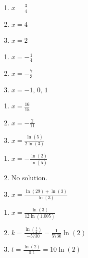 \begin{multicols}{3}
\begin{enumerate}

\item $x = \frac{3}{4}$
\item $x = 4$
\item $x=2$

\setcounter{HW}{\value{enumi}}
\end{enumerate}
\end{multicols}

\begin{multicols}{3}
\begin{enumerate}
\setcounter{enumi}{\value{HW}}

\item $x = -\frac{1}{4}$
\item $x = -\frac{7}{3}$
\item $x = -1, \, 0, \, 1$

\setcounter{HW}{\value{enumi}}
\end{enumerate}
\end{multicols}

\begin{multicols}{3}
\begin{enumerate}
\setcounter{enumi}{\value{HW}}

\item $x = \frac{16}{15}$
\item $x=-\frac{2}{11}$
\item $x = \frac{\ln(5)}{2\ln(3)}$

\setcounter{HW}{\value{enumi}}
\end{enumerate}
\end{multicols}

\begin{multicols}{3}
\begin{enumerate}
\setcounter{enumi}{\value{HW}}

\item $x = -\frac{\ln(2)}{\ln(5)}$
\item No solution.
\item $x = \frac{\ln(29) + \ln(3)}{\ln(3)}$

\setcounter{HW}{\value{enumi}}
\end{enumerate}
\end{multicols}

\begin{multicols}{3}
\begin{enumerate}
\setcounter{enumi}{\value{HW}}

\item $x = \frac{\ln(3)}{12\ln(1.005)}$
\item $k = \frac{\ln\left(\frac{1}{2}\right)}{-5730} = \frac{1}{5730} \ln(2)$
\item $t=\frac{\ln(2)}{0.1} = 10\ln(2)$

\setcounter{HW}{\value{enumi}}
\end{enumerate}
\end{multicols}

